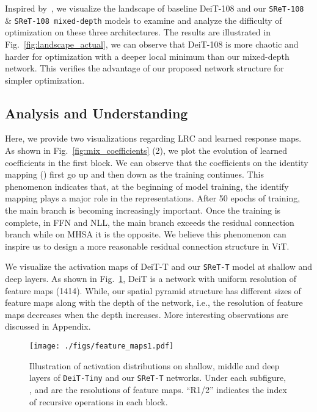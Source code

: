 \documentclass[runningheads]{llncs}
\begin{document}
	Inspired by~\cite{li2018visualizing}, we visualize the landscape of baseline DeiT-108 and our \texttt{SReT-108} \& \texttt{SReT-108 mixed-depth} models to examine and analyze the difficulty of optimization on these three architectures. The results are illustrated in Fig.~\ref{fig:landscape_actual}, we can observe that DeiT-108 is more chaotic and harder for optimization with a deeper local minimum than our mixed-depth network. This verifies the advantage of our proposed network structure for simpler optimization.
	
	\subsection{Analysis and Understanding}\label{ana_und}
	
	Here, we provide two visualizations regarding LRC and learned response maps. \\
	 As shown in Fig.~\ref{fig:mix_coefficients} (2), we plot the evolution of learned coefficients in the first block. We can observe that the coefficients on the identity mapping () first go up and then down as the training continues. This phenomenon indicates that, at the beginning of model training, the identify mapping plays a major role in the representations. After 50 epochs of training, the main branch is becoming increasingly important. Once the training is complete, in FFN and NLL, the main branch exceeds the residual connection branch while on MHSA it is the opposite. We believe this phenomenon can inspire us to design a more reasonable residual connection structure in ViT.
	
	We visualize the activation maps of DeiT-T and our \texttt{SReT-T} model at shallow and deep layers. As shown in Fig.~\ref{fig:feature_maps_vis}, DeiT is a network with uniform resolution of feature maps (1414). While, our spatial pyramid structure has different sizes of feature maps along with the depth of the network, i.e., the resolution of feature maps decreases when the depth increases. More interesting observations are discussed in Appendix.
	
	\begin{figure}[t]
	\begin{minipage}[c]{0.6\textwidth}
			\texttt{[image: ./figs/feature\_maps1.pdf]}
		\end{minipage}\hfill
		\begin{minipage}[c]{0.4\textwidth}\vspace{0.15in}
			\caption{Illustration of activation distributions on shallow, middle and deep layers of \texttt{DeiT-Tiny} and our \texttt{SReT-T} networks. Under each subfigure, ,  and  are the resolutions of feature maps. ``R1/2'' indicates the index of recursive operations in each block.}
			\label{fig:feature_maps_vis}
		\end{minipage}  \vspace{-0.03in}
	\end{figure}
	
\end{document}
